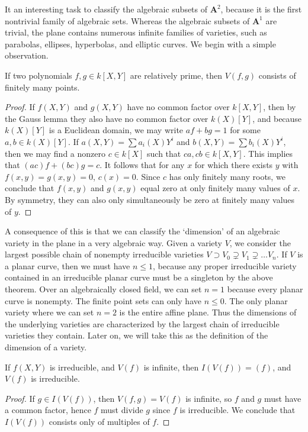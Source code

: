 It an interesting task to classify the algebraic subsets of $\mathbf{A}^2$, because it is the first nontrivial family of algebraic sets. Whereas the algebraic subsets of $\mathbf{A}^1$ are trivial, the plane contains numerous infinite families of varieties, such as parabolas, ellipses, hyperbolas, and elliptic curves. We begin with a simple observation.

\begin{theorem}
    If two polynomials $f,g \in k[X,Y]$ are relatively prime, then $V(f,g)$ consists of finitely many points.
\end{theorem}
\begin{proof}
    If $f(X,Y)$ and $g(X,Y)$ have no common factor over $k[X,Y]$, then by the Gauss lemma they also have no common factor over $k(X)[Y]$, and because $k(X)[Y]$ is a Euclidean domain, we may write $af + bg = 1$ for some $a,b \in k(X)[Y]$. If $a(X,Y) = \sum a_i(X)Y^i$ and $b(X,Y) = \sum b_i(X) Y^i$, then we may find a nonzero $c \in k[X]$ such that $ca, cb \in k[X,Y]$. This implies that $(ac)f + (bc)g = c$. It follows that for any $x$ for which there exists $y$ with $f(x,y) = g(x,y) = 0$, $c(x) = 0$. Since $c$ has only finitely many roots, we conclude that $f(x,y)$ and $g(x,y)$ equal zero at only finitely many values of $x$. By symmetry, they can also only simultaneously be zero at finitely many values of $y$.
\end{proof}

A consequence of this is that we can classify the `dimension' of an algebraic variety in the plane in a very algebraic way. Given a variety $V$, we consider the largest possible chain of nonempty irreducible varieties $V \supset V_0 \supsetneq V_1 \supsetneq \dots V_n$. If $V$ is a planar curve, then we must have $n \leq 1$, because any proper irreducible variety contained in an irreducible planar curve must be a singleton by the above theorem. Over an algebraically closed field, we can set $n = 1$ because every planar curve is nonempty. The finite point sets can only have $n \leq 0$. The only planar variety where we can set $n = 2$ is the entire affine plane. Thus the dimensions of the underlying varieties are characterized by the largest chain of irreducible varieties they contain. Later on, we will take this as the definition of the dimension of a variety.

\begin{corollary}
    If $f(X,Y)$ is irreducible, and $V(f)$ is infinite, then $I(V(f)) = (f)$, and $V(f)$ is irreducible.
\end{corollary}
\begin{proof}
    If $g \in I(V(f))$, then $V(f,g) = V(f)$ is infinite, so $f$ and $g$ must have a common factor, hence $f$ must divide $g$ since $f$ is irreducible. We conclude that $I(V(f))$ consists only of multiples of $f$.
\end{proof}

